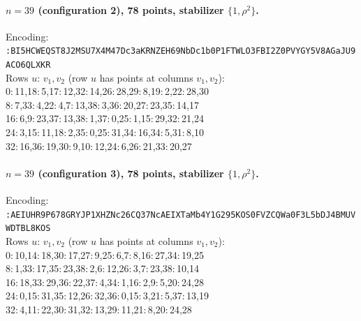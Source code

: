 \paragraph{$n=39$ (configuration 2), 78 points, stabilizer $\{1,\rho^2\}$.} Encoding:\\
{\small \texttt{:BI5HCWEQST8J2MSU7X4M47Dc3aKRN\allowbreak ZEH69NbDc1b0P1FTWLO3FBI2Z0PVYG\allowbreak Y5V8AGaJU9ACO6QLXKR}}\\
Rows $u:\,v_1,v_2$ (row $u$ has points at columns $v_1,v_2$):\\
{\small
  0:\,11,18:\,5,17:\,12,32:\,14,26:\,28,29:\,8,19:\,2,22:\,28,30 \\
  8:\,7,33:\,4,22:\,4,7:\,13,38:\,3,36:\,20,27:\,23,35:\,14,17 \\
  16:\,6,9:\,23,37:\,13,38:\,1,37:\,0,25:\,1,15:\,29,32:\,21,24 \\
  24:\,3,15:\,11,18:\,2,35:\,0,25:\,31,34:\,16,34:\,5,31:\,8,10 \\
  32:\,16,36:\,19,30:\,9,10:\,12,24:\,6,26:\,21,33:\,20,27
}

\paragraph{$n=39$ (configuration 3), 78 points, stabilizer $\{1,\rho^2\}$.} Encoding:\\
{\small \texttt{:AEIUHR9P678GRYJP1XHZNc26CQ37N\allowbreak cAEIXTaMb4Y1G295KOS0FVZCQWa0F3\allowbreak L5bDJ4BMUVWDTBL8KOS}}\\
Rows $u:\,v_1,v_2$ (row $u$ has points at columns $v_1,v_2$):\\
{\small
  0:\,10,14:\,18,30:\,17,27:\,9,25:\,6,7:\,8,16:\,27,34:\,19,25 \\
  8:\,1,33:\,17,35:\,23,38:\,2,6:\,12,26:\,3,7:\,23,38:\,10,14 \\
  16:\,18,33:\,29,36:\,22,37:\,4,34:\,1,16:\,2,9:\,5,20:\,24,28 \\
  24:\,0,15:\,31,35:\,12,26:\,32,36:\,0,15:\,3,21:\,5,37:\,13,19 \\
  32:\,4,11:\,22,30:\,31,32:\,13,29:\,11,21:\,8,20:\,24,28
}

